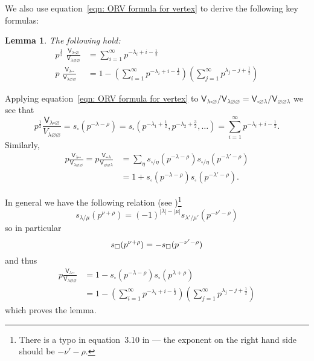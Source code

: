\documentclass[12pt]{amsart}
\newcommand{\Vsf}{\mathsf{V}}
\newcommand{\bx}{\square}
\renewcommand{\emptyset}{\varnothing}
\newcommand{\half}{\frac{1}{2}}
\newtheorem{lemma}[theorem]{Lemma}
\theoremstyle{definition}
\begin{document}
We also use equation~\eqref{eqn: ORV formula for vertex} to derive the
following key formulas:
\begin{lemma}\label{lem: eqns for Vlambdaboxempty/Vlambdaemptyempty
and Vlambdaboxbox/Vlambdaemptyempty} 
The following hold:
\begin{align*}
p^{\half }\,\,  \frac{\Vsf_{\lambda \bx \emptyset}}{\Vsf_{\lambda
\emptyset \emptyset}} &= \sum_{i=1}^{\infty} p^{-\lambda_{i}+i-\half }\\
p\,\,  \frac{\Vsf_{\lambda \bx \bx}}{\Vsf_{\lambda
\emptyset \emptyset}} &= 1-\left(\sum_{i=1}^{\infty}
p^{-\lambda_{i}+i-\half } \right) \left(\sum_{j=1}^{\infty} p^{\lambda_{j}-j+\half } \right)
\end{align*}
\end{lemma}
\proof Applying equation~\eqref{eqn: ORV formula for vertex} to
$\Vsf_{\lambda \bx \emptyset}/\Vsf_{\lambda \emptyset
\emptyset}=\Vsf_{\bx \emptyset \lambda}/\Vsf_{\emptyset \emptyset
\lambda}$ we see that
\[
p^{\half} \frac{\Vsf_{\lambda \bx \emptyset}}{V_{\lambda \emptyset
\emptyset  }} = s_{\bx}(p^{-\lambda -\rho})=s_{\bx}
(p^{-\lambda_{1}+\half },p^{-\lambda_{2}+\frac{3}{2}},\dots ) =
\sum_{i=1}^{\infty} p^{-\lambda_{i}+i-\half }.
\]
Similarly, 
\begin{align*}
p\frac{\Vsf_{\lambda \bx \bx}}{\Vsf_{\lambda \emptyset \emptyset}} =
p\frac{\Vsf_{\bx \bx \lambda}}{\Vsf_{\emptyset \emptyset \lambda }} &=
\sum_{\eta} s_{\bx /\eta}(p^{-\lambda -\rho} )  s_{\bx /\eta}(p^{-\lambda' -\rho} )  \\
&= 1 + s_{\bx}(p^{-\lambda -\rho })s_{\bx}(p^{-\lambda' -\rho }).
\end{align*}

In general we have the following relation (see
\cite[Eqn~(3.10)]{Ok-Re-Va})\footnote{There is a typo in equation~3.10 in
\cite{Ok-Re-Va} --- the exponent on the right hand side should be $-\nu'-\rho$. }
\[
s_{\lambda /\mu}(p^{\nu +\rho}) = (-1)^{|\lambda |-|\mu |}s_{\lambda
'/\mu '}(p^{-\nu '-\rho})
\]
so in particular 
\begin{equation}\label{eqn: s(p^{nu+rho})=-s(p^{-nu'-rho})}
s_{\bx}(p^{\nu +\rho})=-s_{\bx}(p^{-\nu '-\rho})
\end{equation}
and thus
\begin{align*}
p\frac{\Vsf_{\lambda \bx \bx}}{\Vsf_{\lambda \emptyset \emptyset}} &=
1 - s_{\bx}(p^{-\lambda -\rho })s_{\bx}(p^{\lambda +\rho })\\
&= 1-\left(\sum_{i=1}^{\infty} p^{-\lambda_{i}+i-\half }
\right)\left(\sum_{j=1}^{\infty} p^{\lambda_{j}-j+\half } \right)
\end{align*}
which proves the lemma.
\end{document}
